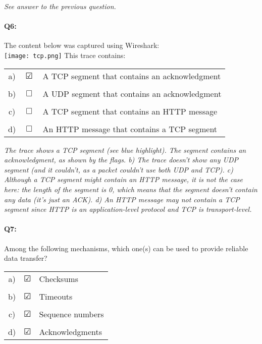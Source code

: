\documentclass{llncs}
\newcommand{\answer}[1]{\color{red}\textit{#1}\color{black}}
\begin{document}
\answer{See answer to the previous question.}

\paragraph{\textbf{Q6:}}
The content below was captured using
Wireshark:\\
\texttt{[image: tcp.png]}
This trace contains:\\

\begin{tabular}{ccl}
  a) & $\CheckedBox$ & A TCP segment that contains an acknowledgment  \\
  \\
  b) & $\Box$ & A UDP segment that contains an acknowledgment \\
  \\
  c) & $\Box$ & A TCP segment that contains an HTTP message \\
  \\
  d) & $\Box$ & An HTTP message that contains a TCP segment \\
\end{tabular}

\answer{The trace shows a TCP segment (see blue highlight). The
  segment contains an acknowledgment, as shown by the flags. b) The
  trace doesn't show any UDP segment (and it couldn't, as a packet
  couldn't use both UDP and TCP). c) Although a TCP segment might
  contain an HTTP message, it is not the case here: the length of the
  segment is 0, which means that the segment doesn't contain any data
  (it's just an ACK). d) An HTTP message may not contain a TCP segment
  since HTTP is an application-level protocol and TCP is transport-level.}

\paragraph{\textbf{Q7:}}
Among the following mechanisms, which one(s) can be used to provide reliable data transfer? 

\begin{tabular}{ccl}
  a) & $\CheckedBox$ & Checksums  \\
  \\
  b) & $\CheckedBox$ &  Timeouts\\
  \\
  c) & $\CheckedBox$ &  Sequence numbers\\
  \\
  d) & $\CheckedBox$ &  Acknowledgments\\
\end{tabular}
\end{document}
